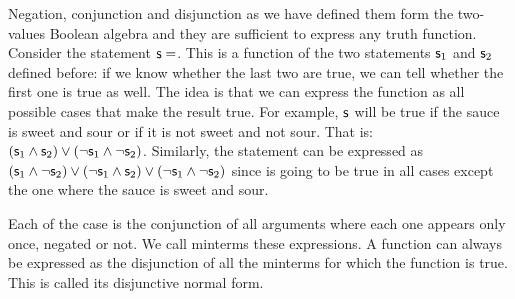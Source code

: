 \documentclass[11pt,letterpaper,fleqn]{memoir} %
\begin{document}
Negation, conjunction and disjunction as we have defined them form the two-values Boolean algebra and they are sufficient to express any truth function. Consider the statement $\mathsf{s}=$. This is a function of the two statements $\mathsf{s}_1$ and $\mathsf{s}_2$ defined before: if we know whether the last two are true, we can tell whether the first one is true as well. The idea is that we can express the function as all possible cases that make the result true. For example, $\mathsf{s}$ will be true if the sauce is sweet and sour or if it is not sweet and not sour. That is: $(\mathsf{s}_1 \wedge \mathsf{s}_2) \vee (\neg \mathsf{s}_1 \wedge \neg \mathsf{s}_2)$. Similarly, the statement  can be expressed as $(\mathsf{s}_1 \wedge \neg \mathsf{s}_2) \vee (\neg \mathsf{s}_1 \wedge \mathsf{s}_2) \vee (\neg \mathsf{s}_1 \wedge \neg \mathsf{s}_2)$ since is going to be true in all cases except the one where the sauce is sweet and sour.

Each of the case is the conjunction of all arguments where each one appears only once, negated or not. We call minterms these expressions. A function can always be expressed as the disjunction of all the minterms for which the function is true. This is called its disjunctive normal form.
\end{document}
